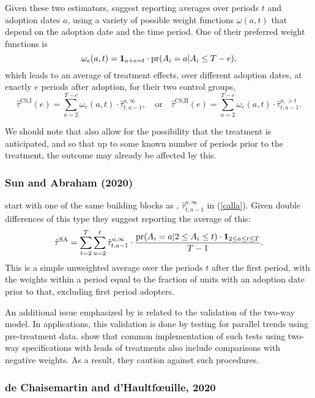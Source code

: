 \documentclass[letterpaper,12pt,leqno]{article}
\newcommand{\pr}{{\rm pr}}
\begin{document}
Given these two estimators, \citep{callaway2020difference} suggest reporting averages over periods $t$ and adoption dates $a$, using a variety of possible weight functions $\omega(a,t)$ that depend on the adoption date and the time period.  One of their preferred weight functions is
\[ \omega_e(a,t)=\mathbf{1}_{a+e=t}\cdot
\pr(A_i=a|A_i\leq T-e),
\]
which leads to an average of treatment effects, over different adoption dates, at exactly $e$ periods after adoption, for their two control groups,
\[ \hat\tau^{\textrm{CS,I}}(e)=\sum_{a=2}^{T-e} \omega_e(a,t)\cdot \hat\tau_{t,a-1}^{a,\infty},
\quad\textrm{
or}\quad
 \hat\tau^{\textrm{CS,II}}(e)=\sum_{a=2}^{T-e} \omega_e(a,t)\cdot \hat\tau_{t,a-1}^{a,>t}.
\]

We should note that
\citep{callaway2020difference} also allow for the possibility that the treatment is anticipated, and so that up to some known number of periods prior to the treatment, the outcome may already be affected by this.

\subsubsection{Sun and Abraham (2020)}


\citep{sun2020estimating} start with one of the same
building blocks as \citep{callaway2020difference}, $\hat\tau_{t,a-1}^{a,\infty}$ in
(\ref{calla}).
Given double differences of this type they suggest reporting the average of this:
\[ \hat\tau^{\textrm{SA}}=\sum_{t=2}^T\sum_{a=2}^t\hat\tau_{t,a-1}^{a,\infty}\cdot \frac{\pr(A_i=a|2\leq A_i\leq t)\cdot 
\mathbf{1}_{2\leq a\leq t\leq T}}{T-1}.\]
This is a simple unweighted average over the periods $t$ after the first period, with the weights within a period equal to the fraction of units with an adoption date prior to that, excluding first period adopters.

An  additional issue emphasized by \citep{sun2020estimating} is related to the validation of the two-way model. In applications, this validation is done by testing for parallel trends using pre-treatment data. \citep{sun2020estimating} show that common implementation of such tests using two-way specifications with leads of treatments also include  comparisons with negative weights. As a result, they caution against such procedures.



\subsubsection{de Chaisemartin and d'Haultf{\oe}uille, 2020}
\end{document}
